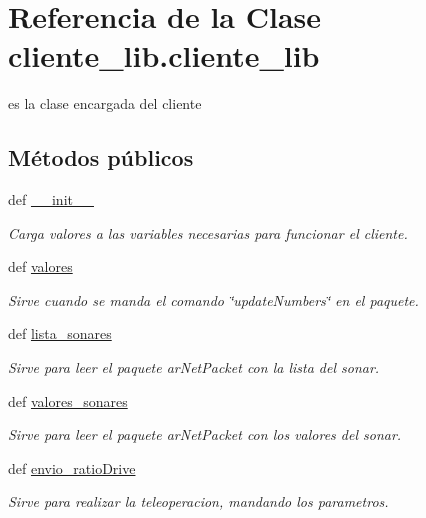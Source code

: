 \hypertarget{classcliente__lib_1_1cliente__lib}{
\section{Referencia de la Clase cliente\_\-lib.cliente\_\-lib}
\label{classcliente__lib_1_1cliente__lib}
}


es la clase encargada del cliente  


\subsection*{Métodos públicos}
\begin{DoxyCompactItemize}
\item 
def \hyperlink{classcliente__lib_1_1cliente__lib_ac5e4490f412835d35481f58d1ae503f9}{\_\-\_\-init\_\-\_\-}
\begin{DoxyCompactList}\small\item\em Carga valores a las variables necesarias para funcionar el cliente. \end{DoxyCompactList}\item 
def \hyperlink{classcliente__lib_1_1cliente__lib_af7b751bcf94c96150b23bacb5e477956}{valores}
\begin{DoxyCompactList}\small\item\em Sirve cuando se manda el comando \char`\"{}updateNumbers\char`\"{} en el paquete. \end{DoxyCompactList}\item 
def \hyperlink{classcliente__lib_1_1cliente__lib_ac0a4410b48b4c759028bec6ae1c641e8}{lista\_\-sonares}
\begin{DoxyCompactList}\small\item\em Sirve para leer el paquete arNetPacket con la lista del sonar. \end{DoxyCompactList}\item 
def \hyperlink{classcliente__lib_1_1cliente__lib_abcf28c2207cb5519090654484137db23}{valores\_\-sonares}
\begin{DoxyCompactList}\small\item\em Sirve para leer el paquete arNetPacket con los valores del sonar. \end{DoxyCompactList}\item 
def \hyperlink{classcliente__lib_1_1cliente__lib_acfc22af72a1668db28d18ab4ff40909e}{envio\_\-ratioDrive}
\begin{DoxyCompactList}\small\item\em Sirve para realizar la teleoperacion, mandando los parametros. \end{DoxyCompactList}\item 

\end{DoxyCompactItemize}
